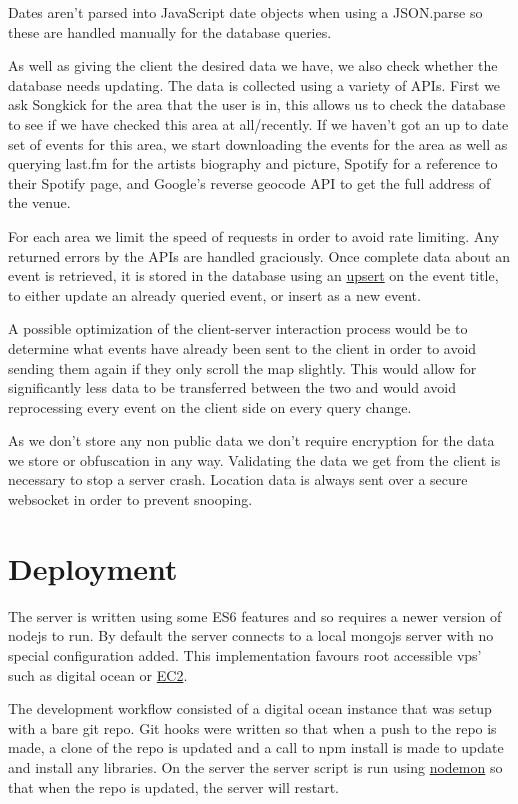 \documentclass[10pt]{article}
\begin{document}
        Dates aren't parsed into JavaScript date objects when using a JSON.parse so these are handled manually for the database queries.

        As well as giving the client the desired data we have, we also check whether the database needs updating. The data is collected using a variety of APIs. First we ask Songkick for the area that the user is in, this allows us to check the database to see if we have checked this area at all/recently. If we haven't got an up to date set of events for this area, we start downloading the events for the area as well as querying last.fm for the artists biography and picture, Spotify for a reference to their Spotify page, and Google's reverse geocode API to get the full address of the venue.

        For each area we limit the speed of requests in order to avoid rate limiting. Any returned errors by the APIs are handled graciously. Once complete data about an event is retrieved, it is stored in the database using an \href{https://docs.mongodb.com/manual/reference/method/db.collection.update/#upsert-option}{upsert} on the event title, to either update an already queried event, or insert as a new event.

        A possible optimization of the client-server interaction process would be to determine what events have already been sent to the client in order to avoid sending them again if they only scroll the map slightly. This would allow for significantly less data to be transferred between the two and would avoid reprocessing every event on the client side on every query change.

        As we don't store any non public data we don't require encryption for the data we store or obfuscation in any way. Validating the data we get from the client is necessary to stop a server crash. Location data is always sent over a secure websocket in order to prevent snooping.

    \section{Deployment}
        The server is written using some ES6 features and so requires a newer version of nodejs to run. By default the server connects to a local mongojs server with no special configuration added. This implementation favours root accessible vps' such as digital ocean or \href{https://aws.amazon.com/ec2/}{EC2}.

        The development workflow consisted of a digital ocean instance that was setup with a bare git repo. Git hooks were written so that when a push to the repo is made, a clone of the repo is updated and a call to npm install is made to update and install any libraries. On the server the server script is run using \href{https://github.com/remy/nodemon}{nodemon} so that when the repo is updated, the server will restart.
\end{document}
